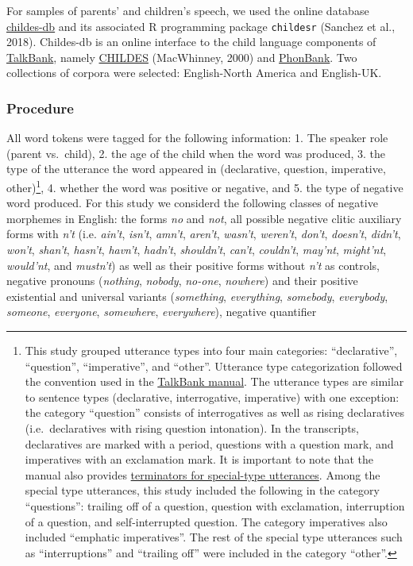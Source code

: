 \documentclass[man,floatsintext,draftall]{apa6}
\let\rmarkdownfootnote\footnote%
\def\footnote{\protect\rmarkdownfootnote}
\begin{document}
For samples of parents' and children's speech, we used the online database \href{childes-db.stanford.edu}{childes-db} and its associated R programming package \texttt{childesr} (Sanchez et al., 2018). Childes-db is an online interface to the child language components of \href{https://talkbank.org/}{TalkBank}, namely \href{https://childes.talkbank.org/}{CHILDES} (MacWhinney, 2000) and \href{https://phonbank.talkbank.org/}{PhonBank}. Two collections of corpora were selected: English-North America and English-UK.

\hypertarget{procedure}{%
\subsubsection{Procedure}\label{procedure}}

All word tokens were tagged for the following information: 1. The speaker role (parent vs.~child), 2. the age of the child when the word was produced, 3. the type of the utterance the word appeared in (declarative, question, imperative, other)\footnote{This study grouped utterance types into four main categories: \enquote{declarative}, \enquote{question}, \enquote{imperative}, and \enquote{other}. Utterance type categorization followed the convention used in the \href{https://talkbank.org/manuals/CHAT.html\#_Toc486414422}{TalkBank manual}. The utterance types are similar to sentence types (declarative, interrogative, imperative) with one exception: the category \enquote{question} consists of interrogatives as well as rising declaratives (i.e.~declaratives with rising question intonation). In the transcripts, declaratives are marked with a period, questions with a question mark, and imperatives with an exclamation mark. It is important to note that the manual also provides \href{https://talkbank.org/manuals/CHAT.html\#_Toc486414431}{terminators for special-type utterances}. Among the special type utterances, this study included the following in the category \enquote{questions}: trailing off of a question, question with exclamation, interruption of a question, and self-interrupted question. The category imperatives also included \enquote{emphatic imperatives}. The rest of the special type utterances such as \enquote{interruptions} and \enquote{trailing off} were included in the category \enquote{other}.}, 4. whether the word was positive or negative, and 5. the type of negative word produced. For this study we considerd the following classes of negative morphemes in English: the forms \emph{no} and \emph{not}, all possible negative clitic auxiliary forms with \emph{n't} (i.e. \emph{ain't}, \emph{isn't}, \emph{amn't}, \emph{aren't}, \emph{wasn't}, \emph{weren't}, \emph{don't}, \emph{doesn't}, \emph{didn't}, \emph{won't}, \emph{shan't}, \emph{hasn't}, \emph{havn't}, \emph{hadn't}, \emph{shouldn't}, \emph{can't}, \emph{couldn't}, \emph{may'nt}, \emph{might'nt}, \emph{would'nt}, and \emph{mustn't}) as well as their positive forms without \emph{n't} as controls, negative pronouns (\emph{nothing}, \emph{nobody}, \emph{no-one}, \emph{nowhere}) and their positive existential and universal variants (\emph{something}, \emph{everything}, \emph{somebody}, \emph{everybody}, \emph{someone}, \emph{everyone}, \emph{somewhere}, \emph{everywhere}), negative quantifier 
\end{document}
